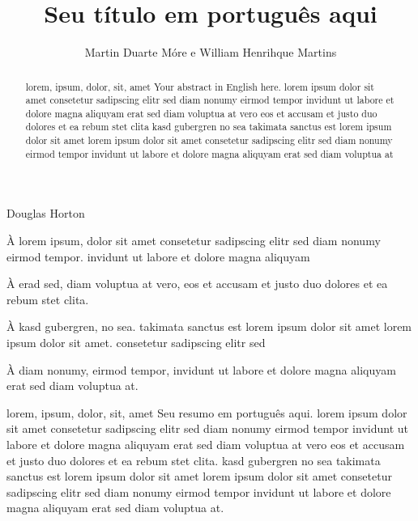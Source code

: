 \documentclass[portuguese,oneside]{tcc}
\author{Martin Duarte Móre e William Henrihque Martins}
\title{Seu título em português aqui}
      {Your title in english here}
\begin{document}

         {Douglas Horton}

\begin{agradecimentos}
À lorem ipsum, dolor sit amet consetetur sadipscing elitr sed diam
nonumy eirmod tempor. invidunt ut labore et dolore magna aliquyam

À erad sed, diam voluptua at vero, eos et accusam et justo duo
dolores et ea rebum stet clita.

À kasd gubergren, no sea. takimata sanctus est lorem ipsum dolor sit
amet lorem ipsum dolor sit amet. consetetur sadipscing elitr sed

À diam nonumy, eirmod tempor, invidunt ut labore et dolore magna
aliquyam erat sed diam voluptua at.
\end{agradecimentos}

\begin{resumo}{lorem, ipsum, dolor, sit, amet}
Seu resumo em português aqui. lorem ipsum dolor sit amet
consetetur sadipscing elitr sed diam nonumy eirmod tempor invidunt
ut labore et dolore magna aliquyam erat sed diam voluptua at vero
eos et accusam et justo duo dolores et ea rebum stet clita.  kasd
gubergren no sea takimata sanctus est lorem ipsum dolor sit amet
lorem ipsum dolor sit amet consetetur sadipscing elitr sed diam
nonumy eirmod tempor invidunt ut labore et dolore magna aliquyam
erat sed diam voluptua at.
\end{resumo}

\begin{abstract}{lorem, ipsum, dolor, sit, amet}
Your abstract in English here. lorem ipsum dolor sit amet
consetetur sadipscing elitr sed diam nonumy eirmod tempor invidunt
ut labore et dolore magna aliquyam erat sed diam voluptua at vero
eos et accusam et justo duo dolores et ea rebum stet clita kasd
gubergren no sea takimata sanctus est lorem ipsum dolor sit amet
lorem ipsum dolor sit amet consetetur sadipscing elitr sed diam
nonumy eirmod tempor invidunt ut labore et dolore magna aliquyam
erat sed diam voluptua at
\end{abstract}

\listoffigures
\listofalgorithms
\tableofcontents









\end{document}

